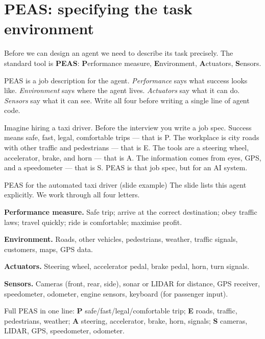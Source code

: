 \documentclass[a4paper,11pt]{article}
\begin{document}
\section{PEAS: specifying the task environment}

Before we can design an agent we need to describe its task precisely.
The standard tool is \textbf{PEAS}:
\textbf{P}erformance measure,
\textbf{E}nvironment,
\textbf{A}ctuators,
\textbf{S}ensors.

\begin{intuition}
PEAS is a job description for the agent.
\emph{Performance} says what success looks like.
\emph{Environment} says where the agent lives.
\emph{Actuators} say what it can do.
\emph{Sensors} say what it can see.
Write all four before writing a single line of agent code.
\end{intuition}

\begin{everyday}
Imagine hiring a taxi driver. Before the interview you write a job spec.
Success means safe, fast, legal, comfortable trips --- that is P.
The workplace is city roads with other traffic and pedestrians --- that is E.
The tools are a steering wheel, accelerator, brake, and horn --- that is A.
The information comes from eyes, GPS, and a speedometer --- that is S.
PEAS is that job spec, but for an AI system.
\end{everyday}

\begin{worked}{PEAS for the automated taxi driver (slide example)}
The slide lists this agent explicitly. We work through all four letters.
\begin{steps}
  \item \textbf{Performance measure.}
        Safe trip; arrive at the correct destination; obey traffic laws;
        travel quickly; ride is comfortable; maximise profit.
  \item \textbf{Environment.}
        Roads, other vehicles, pedestrians, weather, traffic signals,
        customers, maps, GPS data.
  \item \textbf{Actuators.}
        Steering wheel, accelerator pedal, brake pedal, horn, turn signals.
  \item \textbf{Sensors.}
        Cameras (front, rear, side), sonar or LIDAR for distance,
        GPS receiver, speedometer, odometer, engine sensors, keyboard
        (for passenger input).
\end{steps}
Full PEAS in one line: \textbf{P} safe/fast/legal/comfortable trip;
\textbf{E} roads, traffic, pedestrians, weather;
\textbf{A} steering, accelerator, brake, horn, signals;
\textbf{S} cameras, LIDAR, GPS, speedometer, odometer.
\end{worked}
\end{document}
